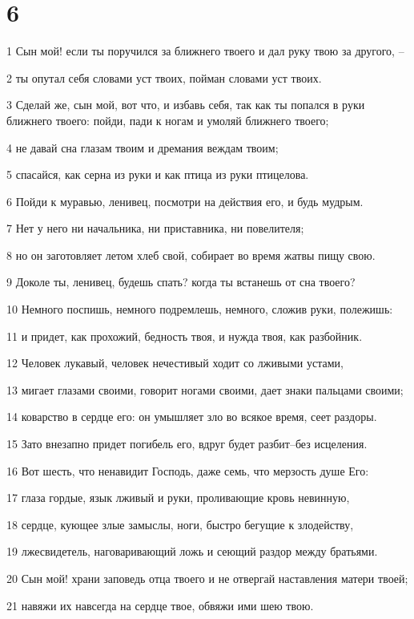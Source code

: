 \chapter{6}

\par 1 Сын мой! если ты поручился за ближнего твоего и дал руку твою за другого, --
\par 2 ты опутал себя словами уст твоих, пойман словами уст твоих.
\par 3 Сделай же, сын мой, вот что, и избавь себя, так как ты попался в руки ближнего твоего: пойди, пади к ногам и умоляй ближнего твоего;
\par 4 не давай сна глазам твоим и дремания веждам твоим;
\par 5 спасайся, как серна из руки и как птица из руки птицелова.
\par 6 Пойди к муравью, ленивец, посмотри на действия его, и будь мудрым.
\par 7 Нет у него ни начальника, ни приставника, ни повелителя;
\par 8 но он заготовляет летом хлеб свой, собирает во время жатвы пищу свою.
\par 9 Доколе ты, ленивец, будешь спать? когда ты встанешь от сна твоего?
\par 10 Немного поспишь, немного подремлешь, немного, сложив руки, полежишь:
\par 11 и придет, как прохожий, бедность твоя, и нужда твоя, как разбойник.
\par 12 Человек лукавый, человек нечестивый ходит со лживыми устами,
\par 13 мигает глазами своими, говорит ногами своими, дает знаки пальцами своими;
\par 14 коварство в сердце его: он умышляет зло во всякое время, сеет раздоры.
\par 15 Зато внезапно придет погибель его, вдруг будет разбит--без исцеления.
\par 16 Вот шесть, что ненавидит Господь, даже семь, что мерзость душе Его:
\par 17 глаза гордые, язык лживый и руки, проливающие кровь невинную,
\par 18 сердце, кующее злые замыслы, ноги, быстро бегущие к злодейству,
\par 19 лжесвидетель, наговаривающий ложь и сеющий раздор между братьями.
\par 20 Сын мой! храни заповедь отца твоего и не отвергай наставления матери твоей;
\par 21 навяжи их навсегда на сердце твое, обвяжи ими шею твою.
